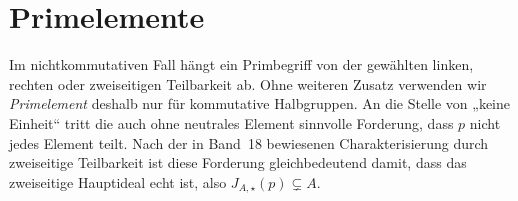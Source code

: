 \documentclass[main.tex]{subfiles}
\begin{document}
\begin{tabproof}
\end{tabproof}

\begin{tabproof}
\end{tabproof}

\section{Primelemente}

Im nichtkommutativen Fall hängt ein Primbegriff von der gewählten linken,
rechten oder zweiseitigen Teilbarkeit ab.  Ohne weiteren Zusatz verwenden
wir \emph{Primelement} deshalb nur für kommutative Halbgruppen.  An die Stelle
von „keine Einheit“ tritt die auch ohne neutrales Element sinnvolle
Forderung, dass \(p\) nicht jedes Element teilt. Nach der in Band~18
bewiesenen Charakterisierung durch zweiseitige Teilbarkeit ist diese
Forderung gleichbedeutend damit, dass das zweiseitige Hauptideal echt ist,
also \(J_{A,\star}(p)\subsetneq A\).
\end{document}
